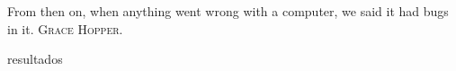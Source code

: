 %
%
%

{
  \epigrafe
  {%
    From then on, when anything went wrong with a computer, we said it had bugs
    in it.%
  }
  {%
     \textsc{Grace Hopper}.%
  }
}

\noindent

{resultados}
